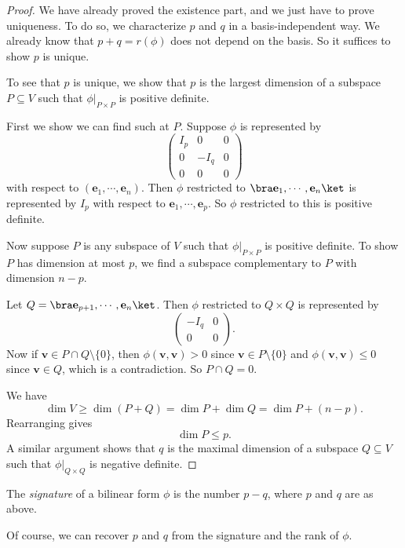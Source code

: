 \documentclass[a4paper]{article}
\begin{document}
\begin{proof}
  We have already proved the existence part, and we just have to prove uniqueness. To do so, we characterize $p$ and $q$ in a basis-independent way. We already know that $p + q = r(\phi)$ does not depend on the basis. So it suffices to show $p$ is unique.

  To see that $p$ is unique, we show that $p$ is the largest dimension of a subspace $P \subseteq V$ such that $\phi|_{P\times P}$ is positive definite.

  First we show we can find such at $P$. Suppose $\phi$ is represented by
  \[
    \begin{pmatrix}
      I_p & 0 & 0\\
      0 & -I_q & 0\\
      0 & 0 & 0
    \end{pmatrix}
  \]
  with respect to $(\mathbf{e}_1, \cdots, \mathbf{e}_n)$. Then $\phi$ restricted to $\bra \mathbf{e}_1, \cdots, \mathbf{e}_n\ket$ is represented by $I_p$ with respect to $\mathbf{e}_1, \cdots, \mathbf{e}_p$. So $\phi$ restricted to this is positive definite.

  Now suppose $P$ is any subspace of $V$ such that $\phi|_{P \times P}$ is positive definite. To show $P$ has dimension at most $p$, we find a subspace complementary to $P$ with dimension $n - p$.

  Let $Q = \bra \mathbf{e}_{p + 1}, \cdots, \mathbf{e}_n\ket$. Then $\phi$ restricted to $Q\times Q$ is represented by
  \[
    \begin{pmatrix}
      -I_q& 0\\
      0 & 0
    \end{pmatrix}.
  \]
  Now if $\mathbf{v} \in P\cap Q \setminus \{0\}$, then $\phi(\mathbf{v}, \mathbf{v}) > 0$ since $\mathbf{v}\in P\setminus \{0\}$ and $\phi(\mathbf{v}, \mathbf{v}) \leq 0$ since $\mathbf{v}\in Q$, which is a contradiction. So $P\cap Q = 0$.

  We have
  \[
    \dim V \geq \dim (P + Q) = \dim P + \dim Q = \dim P + (n - p).
  \]
  Rearranging gives
  \[
    \dim P \leq p.
\]
  A similar argument shows that $q$ is the maximal dimension of a subspace $Q\subseteq V$ such that $\phi|_{Q\times Q}$ is negative definite.
\end{proof}

\begin{defi}[Signature]
  The \emph{signature} of a bilinear form $\phi$ is the number $p - q$, where $p$ and $q$ are as above.
\end{defi}
Of course, we can recover $p$ and $q$ from the signature and the rank of $\phi$.
\end{document}
